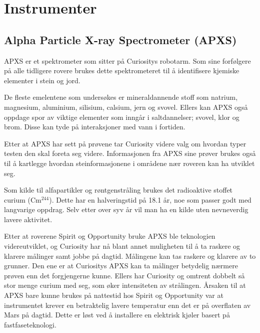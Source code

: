 \documentclass[5p]{elsarticle}
\renewenvironment{abstract}{\global\setbox\absbox=\vbox\bgroup
\hsize=\textwidth\def\baselinestretch{1}%
\noindent\unskip\textbf{Introduksjon}
\par\medskip\noindent\unskip\ignorespaces}
{\egroup}
\begin{document}

\section*{Instrumenter}
\subsection*{Alpha Particle X-ray Spectrometer (APXS)}
APXS er et spektrometer som sitter på Curiositys robotarm.
Som sine forfølgere på alle tidligere rovere brukes dette spektrometeret til å identifisere kjemiske elementer i stein og jord.

De fleste emelentene som undersøkes er mineraldannende stoff som natrium, magnesium, aluminium, silisium, calsium, jern og svovel.
Ellers kan APXS også oppdage spor av viktige elementer som inngår i saltdannelser; svovel, klor og brom.
Disse kan tyde på interaksjoner med vann i fortiden.

Etter at APXS har sett på prøvene tar Curiosity videre valg om hvordan typer testen den skal foreta seg videre.
Informasjonen fra APXS sine prøver brukes også til å kartlegge hvordan steinformasjonene i områdene nær roveren kan ha utviklet seg.

Som kilde til alfapartikler og røntgenstråling brukes det radioaktive stoffet curium (Cm$^{244}$).
Dette har en halveringstid på 18.1 år, noe som passer godt med langvarige oppdrag.
Selv etter over syv år vil man ha en kilde uten nevneverdig lavere aktivitet.

Etter at roverene Spirit og Opportunity bruke APXS ble teknologien videreutviklet, og Curiosity har nå blant annet muligheten til å ta raskere og klarere målinger samt jobbe på dagtid.
Målingene kan tas raskere og klarere av to grunner.
Den ene er at Curiositys APXS kan ta målinger betydelig nærmere prøven enn det forgjengerne kunne.
Ellers har Curiosity og omtrent dobbelt så stor menge curium med seg, som øker intensiteten av strålingen.
Årsaken til at APXS bare kunne brukes på nattestid hos Spirit og Opportunity var at instrumentet krever en betraktelig lavere temperatur enn det er på overflaten av Mars på dagtid.
Dette er løst ved å installere en elektrisk kjøler basert på fastfaseteknologi.
\end{document}
